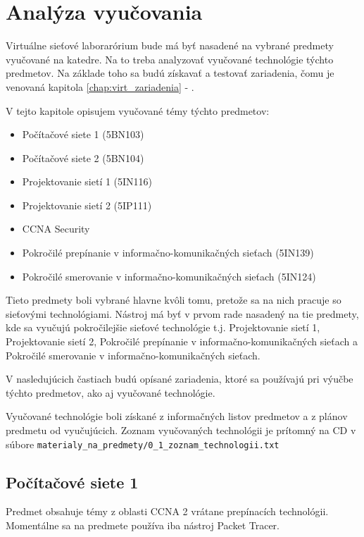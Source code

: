 \chapter{Analýza vyučovania}
\label{chap:analyza_vyucovania}

Virtuálne sieťové laborarórium bude má byť nasadené na vybrané predmety vyučované na katedre. Na to treba analyzovať vyučované technológie týchto predmetov. Na základe toho sa budú získavať a testovať zariadenia, čomu je venovaná kapitola \ref{chap:virt_zariadenia} - .

V tejto kapitole opisujem vyučované témy týchto predmetov:
\begin{itemize}[noitemsep]
    \item Počítačové siete 1 (5BN103)
    \item Počítačové siete 2 (5BN104)
    \item Projektovanie sietí 1 (5IN116)
    \item Projektovanie sietí 2 (5IP111)
    \item CCNA Security
    \item Pokročilé prepínanie v informačno-komunikačných sieťach (5IN139)
    \item Pokročilé smerovanie v informačno-komunikačných sieťach (5IN124)
\end{itemize}

Tieto predmety boli vybrané hlavne kvôli tomu, pretože sa na nich pracuje so sieťovými technológiami. Nástroj má byť v prvom rade nasadený na tie predmety, kde sa vyučujú pokročilejšie sieťové technológie t.j. Projektovanie sietí 1, Projektovanie sietí 2, Pokročilé prepínanie v informačno-komunikačných sieťach a Pokročilé smerovanie v informačno-komunikačných sieťach.

V nasledujúcich častiach budú opísané zariadenia, ktoré sa používajú pri výučbe týchto predmetov, ako aj vyučované technológie.

Vyučované technológie boli získané z informačných listov predmetov a z plánov predmetu od vyučujúcich. Zoznam vyučovaných technológii je prítomný na CD v súbore \texttt{materialy\_na\_predmety/0\_1\_zoznam\_technologii.txt}




\section{Počítačové siete 1}

Predmet obsahuje témy z oblasti CCNA 2 vrátane prepínacích technológii. Momentálne sa na predmete používa iba nástroj Packet Tracer.

